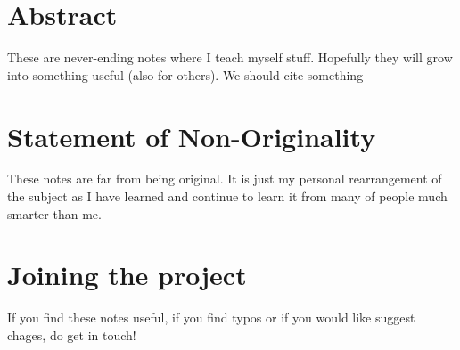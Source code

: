 \section*{Abstract}
These are never-ending notes where I teach myself stuff. 
Hopefully they will grow into something useful (also for others).
We should cite something \cite{ArchidiaconoCastorinaRedigoloSalvioni_UnveilingDarkFifthForcesLinearCosmology_2022}


\section*{Statement of Non-Originality}
These notes are far from being original.
It is just my personal rearrangement of the subject as I have learned and continue to learn it from many of people much smarter than me.

\section*{Joining the project}
If you find these notes useful, if you find typos or if you would like suggest chages, do get in touch!
